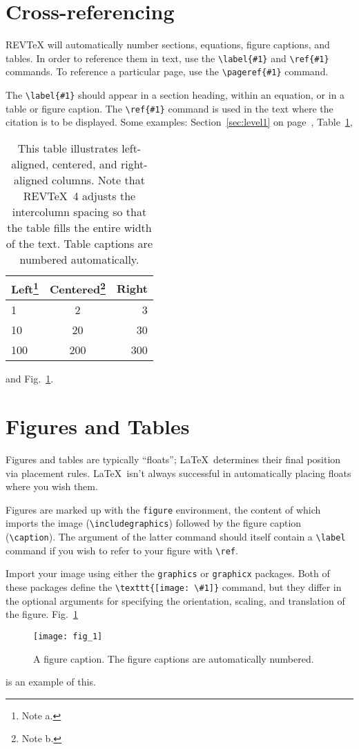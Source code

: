 \documentclass[aip,cp,amsmath,amssymb,reprint]{revtex4-2}
\begin{document}
\section{Cross-referencing}
REV\TeX{} will automatically number sections, equations, figure
captions, and tables. In order to reference them in text, use the
\verb+\label{#1}+ and \verb+\ref{#1}+ commands. To reference a
particular page, use the \verb+\pageref{#1}+ command.

The \verb+\label{#1}+ should appear in a section heading, within an
equation, or in a table or figure caption. The \verb+\ref{#1}+ command
is used in the text where the citation is to be displayed.  Some
examples: Section~\ref{sec:level1} on page~\pageref{sec:level1},
Table~\ref{tab:table1},%
\begin{table}
\caption{\label{tab:table1}This table illustrates left-aligned, centered,
and right-aligned columns. Note that REV\TeX~4 adjusts the
intercolumn spacing so that the table fills the entire width of the text.
Table captions are numbered automatically.  }
\begin{ruledtabular}
\begin{tabular}{lcr}
Left\footnote{Note a.}&Centered\footnote{Note b.}&Right\\
\hline
1 & 2 & 3\\
10 & 20 & 30\\
100 & 200 & 300\\
\end{tabular}
\end{ruledtabular}
\end{table}
and Fig.~\ref{fig:epsart}.

\section{Figures and Tables}
Figures and tables are typically ``floats''; \LaTeX\ determines their
final position via placement rules.
\LaTeX\ isn't always successful in automatically placing floats where you wish them.

Figures are marked up with the \texttt{figure} environment, the content of which
imports the image (\verb+\includegraphics+) followed by the figure caption (\verb+\caption+).
The argument of the latter command should itself contain a \verb+\label+ command if you
wish to refer to your figure with \verb+\ref+.

Import your image using either the \texttt{graphics} or
\texttt{graphicx} packages. Both of these packages define the
\verb+\texttt{[image: \#1]}+ command, but they differ in the optional
arguments for specifying the orientation, scaling, and translation of the figure.
Fig.~\ref{fig:epsart}%
\begin{figure}
\texttt{[image: fig\_1]}%
\caption{\label{fig:epsart} A figure caption. The figure captions are
automatically numbered.}
\end{figure}
is an example of this.
\end{document}
